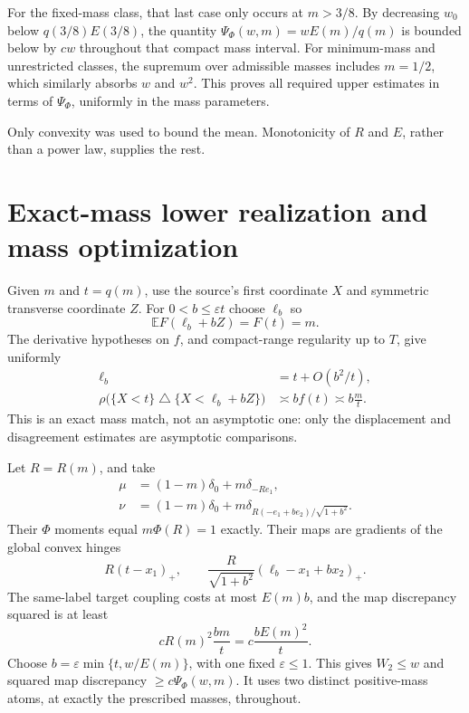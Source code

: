 For the fixed-mass class, that last case only occurs at \(m>3/8\). By decreasing \(w_0\) below \(q(3/8)E(3/8)\), the quantity \(\Psi_\Phi(w,m)=wE(m)/q(m)\) is bounded below by \(cw\) throughout that compact mass interval. For minimum-mass and unrestricted classes, the supremum over admissible masses includes \(m=1/2\), which similarly absorbs \(w\) and \(w^2\). This proves all required upper estimates in terms of \(\Psi_\Phi\), uniformly in the mass parameters.

Only convexity was used to bound the mean. Monotonicity of \(R\) and \(E\), rather than a power law, supplies the rest.

\section{Exact-mass lower realization and mass optimization}\label{sec:gm-lower}

Given \(m\) and \(t=q(m)\), use the source's first coordinate \(X\) and symmetric transverse coordinate \(Z\). For \(0<b\le\varepsilon t\) choose \(\ell_b\) so
\[
 \mathbb E F(\ell_b+bZ)=F(t)=m.
\]
The derivative hypotheses on \(f\), and compact-range regularity up to \(T\), give uniformly
\begin{equation}
 \begin{aligned}
 \ell_b&=t+O(b^2/t),\\
 \rho\bigl(\{X<t\}\mathbin{\triangle}\{X<\ell_b+bZ\}\bigr)
 &\asymp bf(t)\asymp b\frac mt.
 \end{aligned}
 \tag{4.1}\label{eq:gm-mass-match}
\end{equation}
This is an exact mass match, not an asymptotic one: only the displacement and disagreement estimates are asymptotic comparisons.

Let \(R=R(m)\), and take
\begin{equation}
 \begin{aligned}
 \mu&=(1-m)\delta_0+m\delta_{-Re_1},\\
 \nu&=(1-m)\delta_0+
       m\delta_{R(-e_1+be_2)/\sqrt{1+b^2}}.
 \end{aligned}
 \tag{4.2}\label{eq:gm-hinge-targets}
\end{equation}
Their \(\Phi\) moments equal \(m\Phi(R)=1\) exactly. Their maps are gradients of the global convex hinges
\[
 R(t-x_1)_+,\qquad
 \frac R{\sqrt{1+b^2}}(\ell_b-x_1+bx_2)_+.
\]
The same-label target coupling costs at most \(E(m)b\), and the map discrepancy squared is at least
\[
 cR(m)^2\frac{bm}{t}=c\frac{bE(m)^2}{t}.
\]
Choose \(b=\varepsilon\min\{t,w/E(m)\}\), with one fixed \(\varepsilon\le1\). This gives \(W_2\le w\) and squared map discrepancy \(\ge c\Psi_\Phi(w,m)\). It uses two distinct positive-mass atoms, at exactly the prescribed masses, throughout.

